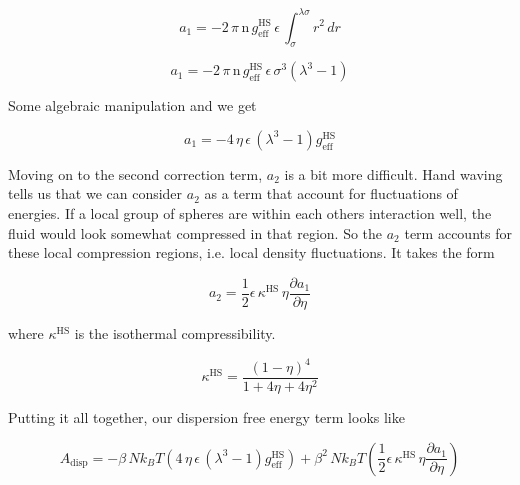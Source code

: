 \begin{equation}
a_1 = - 2 \, \pi \, \text{n} \, g^{\text{HS}}_{\text{eff}} \, \epsilon \, \int^{\lambda \sigma}_{\sigma} r^2 \, dr
\end{equation}


\begin{equation}
a_1 = - 2 \, \pi \, \text{n} \, g^{\text{HS}}_{\text{eff}} \, \epsilon \, \sigma^3 (\lambda^3 -1)
\end{equation}

Some algebraic manipulation and we get

\begin{equation}
a_1 = -4 \, \eta \, \epsilon \, (\lambda^3 -1) g^{\text{HS}}_{\text{eff}}
\end{equation}



Moving on to the second correction term, $a_2$ is a bit more difficult.  Hand waving tells us that we can consider $a_2$ as a term that account for fluctuations of energies.  If a local group of spheres are within each others interaction well, the fluid would look somewhat compressed in that region.  So the $a_2$ term accounts for these local compression regions, i.e. local density fluctuations. It takes the form

\begin{equation}
a_2 = \frac{1}{2} \epsilon \, \kappa^{\text{HS}} \, \eta \frac{\partial a_1}{\partial \eta}
\end{equation}  

where $\kappa^{\text{HS}}$ is the isothermal compressibility.

\begin{equation}
\kappa^{\text{HS}} = \frac{(1-\eta)^4}{1+4 \eta + 4 \eta^2}
\end{equation}



Putting it all together, our dispersion free energy term looks like

\begin{equation}
A_{\text{disp}} = - \beta \, N k_B T \left( 4 \, \eta \, \epsilon \, (\lambda^3 -1) g^{\text{HS}}_{\text{eff}} \right) + \beta^2 \, N k_B T \left( \frac{1}{2} \epsilon \, \kappa^{\text{HS}} \, \eta \frac{\partial a_1}{\partial \eta} \right) 
\end{equation}















